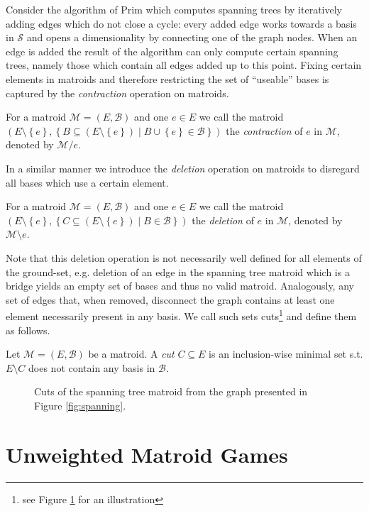 \documentclass{scrartcl}
\theoremstyle{nonumberplain}
\newcommand{\tupel}[1]{\left(#1\right)}
\newcommand{\set}[1]{\left\{#1\right\}}
\begin{document}
Consider the algorithm of Prim which computes spanning trees by iteratively
adding edges which do not close a cycle: every added edge works towards a basis
in $\mathcal{S}$ and opens a dimensionality by connecting one of the graph
nodes. When an edge is added the result of the algorithm can only compute
certain spanning trees, namely those which contain all edges added up to this
point. Fixing certain elements in matroids and therefore restricting the set of
\enquote{useable} bases is captured by the \emph{contraction} operation on
matroids.
\begin{defi}
  For a matroid $\mathcal{M} = \tupel{E, \mathcal{B}}$ and one $e\in E$ we call
  the matroid $\tupel{E\setminus\set{e}, \set{B\subseteq
  (E\setminus\set{e})\middle| B\cup\set{e}\in\mathcal{B}}}$ the
  \emph{contraction} of $e$ in $\mathcal{M}$, denoted by $\mathcal{M}/e$.
\end{defi}
In a similar manner we introduce the \emph{deletion} operation on matroids to
disregard all bases which use a certain element.
\begin{defi}
  For a matroid $\mathcal{M} = \tupel{E, \mathcal{B}}$ and one $e\in E$ we call
  the matroid $\tupel{E\setminus\set{e}, \set{C\subseteq
  (E\setminus\set{e})\middle| B\in\mathcal{B}}}$ the \emph{deletion} of $e$ in
  $\mathcal{M}$, denoted by $\mathcal{M}\setminus e$.
\end{defi}
Note that this deletion operation is not necessarily well defined for all
elements of the ground-set, e.g. deletion of an edge in the spanning tree
matroid which is a bridge yields an empty set of bases and thus no valid
matroid. Analogously, any set of edges that, when removed, disconnect the graph
contains at least one element necessarily present in any basis. We call such
sets cuts\footnote{see Figure \ref{fig:cuts} for an illustration} and define
them as follows.
\begin{defi}
  Let $\mathcal{M} = \tupel{E, \mathcal{B}}$ be a matroid. A \emph{cut}
  $C\subseteq E$ is an inclusion-wise minimal set s.t. $E\setminus C$ does not
  contain any basis in $\mathcal{B}$.
\end{defi}
\begin{figure}
  \begin{center}
  \end{center}
  \caption{Cuts of the spanning tree matroid from the graph presented in Figure
    \ref{fig:spanning}.}
  \label{fig:cuts}
\end{figure}

\section{Unweighted Matroid Games}


\todos
\end{document}
